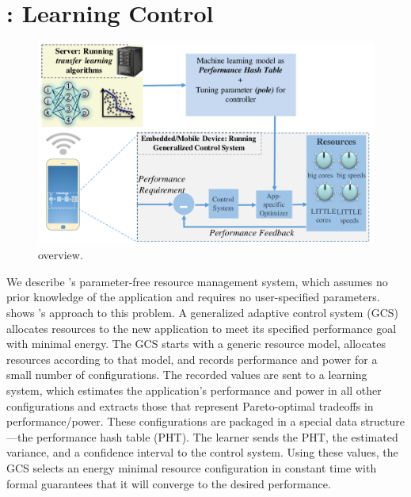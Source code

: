 \section{\SYSTEM{}: Learning Control}
\label{sec:framework}



\begin{figure}
  \includegraphics[width=\columnwidth]{figures/Overview.pdf}
  \caption{\SYSTEM{} overview.}
  \label{fig:overview}
\end{figure}


We describe \SYSTEM{}'s parameter-free resource management system,
which assumes no prior knowledge of the application and requires no
user-specified parameters.   shows \SYSTEM{}'s
approach to this problem.  A generalized adaptive control system (GCS)
allocates resources to the new application to meet its specified
performance goal with minimal energy.  The GCS starts with a generic
resource model, allocates resources according to that model, and
records performance and power for a small number of configurations.
The recorded values are sent to a learning system, which estimates the
application's performance and power in all other configurations and
extracts those that represent Pareto-optimal tradeoffs in
performance/power.  These configurations are packaged in a special
data structure---the performance hash table (PHT).  The learner sends
the PHT, the estimated variance, and a confidence interval to the
control system.  Using these values, the GCS selects an energy minimal
resource configuration in constant time with formal guarantees that it
will converge to the desired performance.

